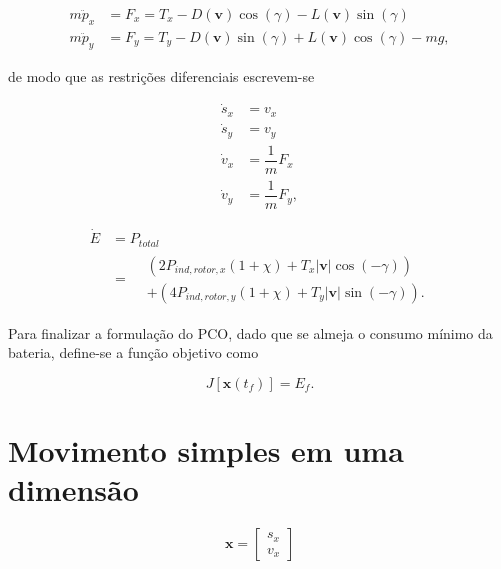 \begin{equation}
\begin{aligned}
    m\ddot{p}_x &= F_x = T_x - D(\mathbf{v}) \cos(\gamma) - L(\mathbf{v}) \sin(\gamma) \\
    m\ddot{p}_y &= F_y = T_y - D(\mathbf{v}) \sin(\gamma) + L(\mathbf{v}) \cos(\gamma) - mg,
\end{aligned}
\end{equation}

\noindent de modo que as restrições diferenciais escrevem-se

\begin{equation}
\begin{aligned}
    \dot{s}_x &= v_x \\
    \dot{s}_y &= v_y \\
    \dot{v}_x &= \dfrac{1}{m} F_x \\
    \dot{v}_y &= \dfrac{1}{m} F_y,
\end{aligned}
\end{equation}

\begin{equation}
\begin{aligned}
    \dot{E}
    &= P_{total} \\
    &=
    \begin{aligned}
        &\left( 2 P_{ind,rotor,x} (1 + \chi) + T_x |\mathbf{v}| \cos(-\gamma) \right) \\
        &+ \left( 4 P_{ind,rotor,y} (1 + \chi) + T_y |\mathbf{v}| \sin(-\gamma) \right).
    \end{aligned}
\end{aligned}
\end{equation}

Para finalizar a formulação do PCO, dado que se almeja o consumo mínimo da bateria, define-se a função objetivo como

\begin{equation}
    J\left[ \mathbf{x} \left( t_f \right) \right] = E_f.
\end{equation}

\section{Movimento simples em uma dimensão}
\label{sec:movimento-simples}

\begin{equation}
    \mathbf{x} = \left[
        \begin{aligned}
            s_x \\
            v_x
        \end{aligned}
    \right]
\end{equation}

